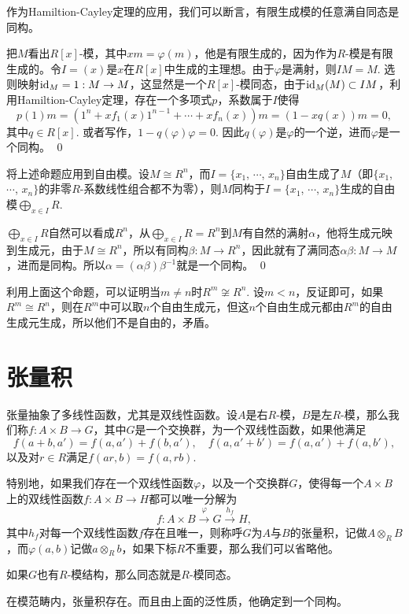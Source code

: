 \para 作为Hamiltion-Cayley定理的应用，我们可以断言，有限生成模的任意满自同态是同构。

\proof
	把$M$看出$R[x]$-模，其中$xm=\varphi(m)$，他是有限生成的，因为作为$R$-模是有限生成的。令$I=(x)$是$x$在$R[x]$中生成的主理想。由于$\varphi$是满射，则$IM=M$. 选则映射$\operatorname{id}_M=1:M\to M$，这显然是一个$R[x]$-模同态，由于$\operatorname{id}_M(M)\subset IM$，利用Hamiltion-Cayley定理，存在一个多项式$p$，系数属于$I$使得
	\[
	p(1)m=\left(1^n+xf_1(x)1^{n-1}+\cdots+xf_n(x)\right)m=(1-xq(x))m=0,
	\]
	其中$q\in R[x]$. 或者写作，$1-q(\varphi)\varphi=0$. 因此$q(\varphi)$是$\varphi$的一个逆，进而$\varphi$是一个同构。
\qed

\para 将上述命题应用到自由模。设$M\cong R^n$，而$I=\{x_1$, $\cdots$, $x_n\}$自由生成了$M$（即$\{x_1$, $\cdots$, $x_n\}$的非零$R$-系数线性组合都不为零），则$M$同构于$I=\{x_1$, $\cdots$, $x_n\}$生成的自由模$\bigoplus_{x\in I} R$.

\proof
	$\bigoplus_{x\in I} R$自然可以看成$R^n$，从$\bigoplus_{x\in I} R=R^n$到$M$有自然的满射$\alpha$，他将生成元映到生成元，由于$M\cong R^n$，所以有同构$\beta:M\to R^n$，因此就有了满同态$\alpha\beta:M\to M$，进而是同构。所以$\alpha =(\alpha\beta)\beta^{-1}$就是一个同构。
\qed

利用上面这个命题，可以证明当$m\neq n$时$R^m\not\cong R^n$. 设$m<n$，反证即可，如果$R^m\cong R^n$，则在$R^m$中可以取$n$个自由生成元，但这$n$个自由生成元都由$R^m$的自由生成元生成，所以他们不是自由的，矛盾。

\section{张量积}

\para 张量抽象了多线性函数，尤其是双线性函数。设$A$是右$R$-模，$B$是左$R$-模，那么我们称$f:A\times B\to G$，其中$G$是一个交换群，为一个双线性函数，如果他满足
\[
	f(a+b,a')=f(a,a')+f(b,a'),\quad f(a,a'+b')=f(a,a')+f(a,b'),
\]
以及对$r\in R$满足$f(ar,b)=f(a,rb)$.

特别地，如果我们存在一个双线性函数$\varphi$，以及一个交换群$G$，使得每一个$A\times B$上的双线性函数$f:A\times B\to H$都可以唯一分解为
\[
	f:A\times B\xrightarrow{\varphi} G\xrightarrow{h_f}H,
\]
其中$h_f$对每一个双线性函数$f$存在且唯一，则称呼$G$为$A$与$B$的张量积，记做$A\otimes_R B$，而$\varphi(a,b)$记做$a\otimes_R b$，如果下标$R$不重要，那么我们可以省略他。

如果$G$也有$R$-模结构，那么同态就是$R$-模同态。

\lem 在模范畴内，张量积存在。而且由上面的泛性质，他确定到一个同构。

